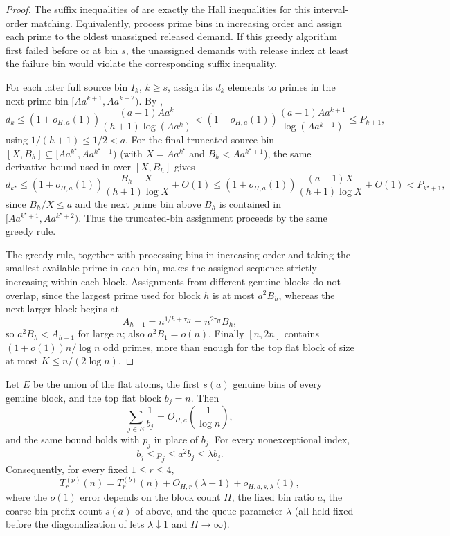 \begin{proof}
The suffix inequalities of  are exactly
the Hall inequalities for this interval-order matching.  Equivalently, process
prime bins in increasing order and assign each prime to the oldest unassigned
released demand.  If this greedy algorithm first failed before or at bin $s$,
the unassigned demands with release index at least the failure bin would
violate the corresponding suffix inequality.

For each later full source bin $I_k$, $k\ge s$, assign its $d_k$ elements to
primes in the next prime bin $[Aa^{k+1},Aa^{k+2})$.  By
,
\[
  d_k
  \le
  (1+o_{H,a}(1))\frac{(a-1)Aa^k}{(h+1)\log(Aa^k)}
  <
  (1-o_{H,a}(1))\frac{(a-1)Aa^{k+1}}{\log(Aa^{k+1})}
  \le P_{k+1},
\]
using $1/(h+1)\le1/2<a$.  For the final truncated source bin
$[X,B_h]\subseteq[Aa^{k^\star},Aa^{k^\star+1})$ (with $X=Aa^{k^\star}$ and
$B_h<Aa^{k^\star+1}$), the same derivative bound used in
 over $[X,B_h]$ gives
\[
  d_{k^\star}
  \le
  (1+o_{H,a}(1))\frac{B_h-X}{(h+1)\log X}+O(1)
  \le
  (1+o_{H,a}(1))\frac{(a-1)X}{(h+1)\log X}+O(1)
  <
  P_{k^\star+1},
\]
since $B_h/X\le a$ and the next prime bin above $B_h$ is contained in
$[Aa^{k^\star+1},Aa^{k^\star+2})$.  Thus the truncated-bin assignment
proceeds by the same greedy rule.

The greedy rule, together with processing bins in increasing order and taking
the smallest available prime in each bin, makes the assigned sequence strictly
increasing within each block.  Assignments from different genuine blocks do
not overlap, since the largest prime used for block $h$ is at most $a^2B_h$,
whereas the next larger block begins at
\[
  A_{h-1}=n^{1/h+\tau_H}=n^{2\tau_H}B_h,
\]
so $a^2B_h<A_{h-1}$ for large $n$; also $a^2B_1=o(n)$.  Finally
$[n,2n]$ contains $(1+o(1))n/\log n$ odd primes, more than enough for the
top flat block of size at most $K\le n/(2\log n)$.
\end{proof}

\begin{lemma}
\label{lem:exceptional-mass-cutoff-discrepancy}
Let $E$ be the union of the flat atoms, the first $s(a)$ genuine bins of every
genuine block, and the top flat block $b_j=n$.  Then
\[
  \sum_{j\in E}\frac1{b_j}=O_{H,a}\left(\frac1{\log n}\right),
  \tag{7.6}\label{eq:exceptional-b-mass}
\]
and the same bound holds with $p_j$ in place of $b_j$.  For every
nonexceptional index,
\[
  b_j\le p_j\le a^2b_j\le\lambda b_j.
  \tag{7.7}\label{eq:nonexceptional-factor}
\]
Consequently, for every fixed $1\le r\le4$,
\[
  T_r^{(p)}(n)=T_r^{(b)}(n)+O_{H,r}(\lambda-1)+o_{H,a,s,\lambda}(1),
\]
where the $o(1)$ error depends on the block count $H$, the fixed bin ratio
$a$, the coarse-bin prefix count $s(a)$ of
 above, and the queue parameter
$\lambda$ (all held fixed before the diagonalization of
 lets $\lambda\downarrow1$ and
$H\to\infty$).
\end{lemma}

